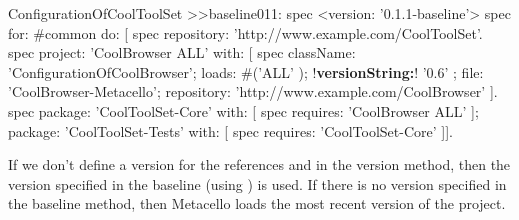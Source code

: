 \documentclass[a4paper,10pt,twoside]{book}
\begin{document}
\begin{code}{}
ConfigurationOfCoolToolSet >>baseline011: spec 
       <version: '0.1.1-baseline'>
       spec for: #common do: [
              spec repository: 'http://www.example.com/CoolToolSet'.
              spec project: 'CoolBrowser ALL' with: [
                            spec 
                                   className: 'ConfigurationOfCoolBrowser';
                                   loads: #('ALL' );
                                   !\textbf{versionString:}! '0.6' ;
                                   file: 'CoolBrowser-Metacello';
                                   repository: 'http://www.example.com/CoolBrowser' ].
              spec 
                     package: 'CoolToolSet-Core' with: [ spec requires: 'CoolBrowser ALL' ];
                     package: 'CoolToolSet-Tests' with: [ spec requires: 'CoolToolSet-Core' ]].
\end{code}       

If we don't define a version for the references   and  in the version method, then the version specified in the baseline (using ) is used.  If there is no version specified in the baseline method, then Metacello loads the most recent version of the project.


%
% 	
% 				
% 		
%
%
%
\end{document}
